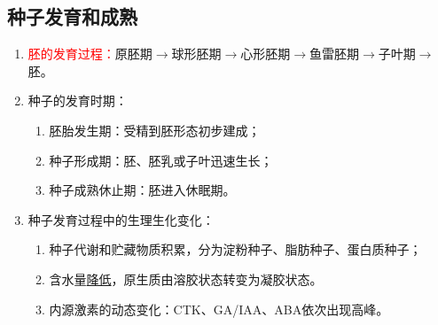 \subsection{种子发育和成熟}
\begin{enumerate}
    \item \textcolor{red}{胚的发育过程：}原胚期$\to$球形胚期$\to$心形胚期$\to$鱼雷胚期$\to$子叶期$\to$胚。
    \item 种子的发育时期：
    \begin{enumerate}
        \item 胚胎发生期：受精到胚形态初步建成；
        \item 种子形成期：胚、胚乳或子叶迅速生长；
        \item 种子成熟休止期：胚进入休眠期。        
    \end{enumerate}
    \item 种子发育过程中的生理生化变化：
    \begin{enumerate}
        \item 种子代谢和贮藏物质积累，分为淀粉种子、脂肪种子、蛋白质种子；
        \item 含水量\uline{降低}，原生质由溶胶状态转变为凝胶状态。
        \item 内源激素的动态变化：CTK、GA/IAA、ABA依次出现高峰。
    \end{enumerate}
\end{enumerate}